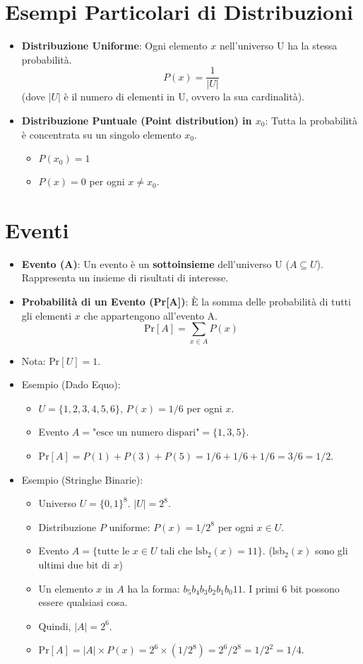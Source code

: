 \documentclass{article}
\begin{document}
\section{Esempi Particolari di Distribuzioni}
\begin{itemize}
    \item \textbf{Distribuzione Uniforme}: Ogni elemento $x$ nell'universo U ha la stessa probabilità.
    \[ P(x) = \frac{1}{|U|} \]
    (dove $|U|$ è il numero di elementi in U, ovvero la sua cardinalità).
    \item \textbf{Distribuzione Puntuale (Point distribution) in $x_0$}: Tutta la probabilità è concentrata su un singolo elemento $x_0$.
    \begin{itemize}
        \item $P(x_0) = 1$
        \item $P(x) = 0$ per ogni $x \neq x_0$.
    \end{itemize}
\end{itemize}

\section{Eventi}
\begin{itemize}
    \item \textbf{Evento (A)}: Un evento è un \textbf{sottoinsieme} dell'universo U ($A \subseteq U$). Rappresenta un insieme di risultati di interesse.
    \item \textbf{Probabilità di un Evento (Pr[A])}: È la somma delle probabilità di tutti gli elementi $x$ che appartengono all'evento A.
    \[ \text{Pr}[A] = \sum_{x \in A} P(x) \]
    \item Nota: $\text{Pr}[U] = 1$.
    \item Esempio (Dado Equo):
    \begin{itemize}
        \item $U = \{1, 2, 3, 4, 5, 6\}$, $P(x) = 1/6$ per ogni $x$.
        \item Evento $A = \text{"esce un numero dispari"} = \{1, 3, 5\}$.
        \item $\text{Pr}[A] = P(1) + P(3) + P(5) = 1/6 + 1/6 + 1/6 = 3/6 = 1/2$.
    \end{itemize}
    \item Esempio (Stringhe Binarie):
    \begin{itemize}
        \item Universo $U = \{0,1\}^8$. $|U| = 2^8$.
        \item Distribuzione $P$ uniforme: $P(x) = 1/2^8$ per ogni $x \in U$.
        \item Evento $A = \{ \text{tutte le } x \in U \text{ tali che lsb}_2(x)=11 \}$. (lsb$_2(x)$ sono gli ultimi due bit di $x$)
        \item Un elemento $x$ in $A$ ha la forma: $b_5 b_4 b_3 b_2 b_1 b_0 1 1$. I primi 6 bit possono essere qualsiasi cosa.
        \item Quindi, $|A| = 2^6$.
        \item $\text{Pr}[A] = |A| \times P(x) = 2^6 \times (1/2^8) = 2^6 / 2^8 = 1/2^2 = 1/4$.
    \end{itemize}
\end{itemize}
\end{document}
